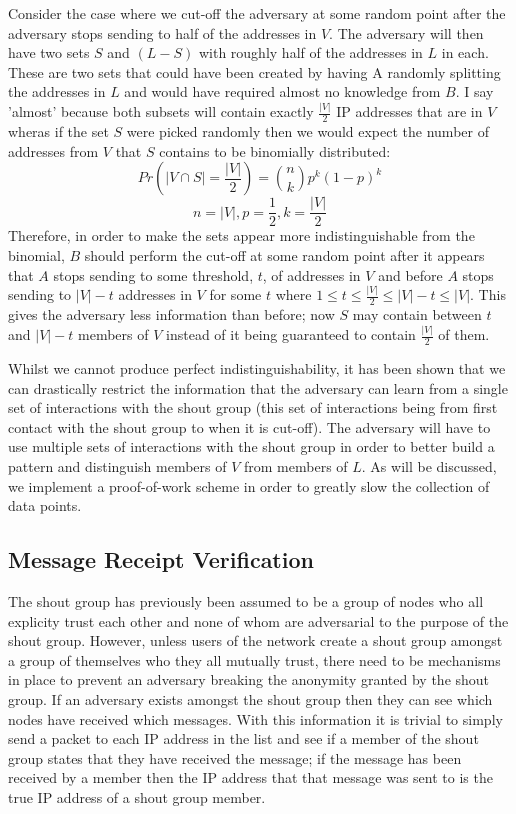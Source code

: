 \documentclass[ %
                    author={Luke Murray},
                supervisor={Dr. Simon Hollis},
                     title={Shadow Peer-to-Peer Networks},
                  subtitle={},
                    degree={MEng},
                      year={2013} ]{thesis}
\begin{document}
Consider the case where we cut-off the adversary at some random point after the adversary stops sending to half of the addresses in $V$. The adversary will then have two sets $S$ and $(L - S)$ with roughly half of the addresses in $L$ in each. These are two sets that could have been created by having A randomly splitting the addresses in $L$ and would have required almost no knowledge from $B$. I say 'almost' because both subsets will contain exactly $\frac{|V|}{2}$ IP addresses that are in $V$ wheras if the set $S$ were picked randomly then we would expect the number of addresses from $V$ that $S$ contains to be binomially distributed: \[Pr(|V \cap S| = \frac{|V|}{2}) = {n \choose k}p^{k}(1-p)^{k}\]\[n = |V|, p = \frac{1}{2}, k = \frac{|V|}{2}\] Therefore, in order to make the sets appear more indistinguishable from the binomial, $B$ should perform the cut-off at some random point after it appears that $A$ stops sending to some threshold, $t$, of addresses in $V$ and before $A$ stops sending to $|V| - t$ addresses in $V$ for some $t$ where $1 \leq t \leq \frac{|V|}{2} \leq |V| - t \leq |V|$. This gives the adversary less information than before; now $S$ may contain between $t$ and $|V| - t$ members of $V$ instead of it being guaranteed to contain $\frac{|V|}{2}$ of them.

Whilst we cannot produce perfect indistinguishability, it has been shown that we can drastically restrict the information that the adversary can learn from a single set of interactions with the shout group (this set of interactions being from first contact with the shout group to when it is cut-off). The adversary will have to use multiple sets of interactions with the shout group in order to better build a pattern and distinguish members of $V$ from members of $L$. As will be discussed, we implement a proof-of-work scheme in order to greatly slow the collection of data points.


\subsection{Message Receipt Verification}

The shout group has previously been assumed to be a group of nodes who all explicity trust each other and none of whom are adversarial to the purpose of the shout group. However, unless users of the network create a shout group amongst a group of themselves who they all mutually trust, there need to be mechanisms in place to prevent an adversary breaking the anonymity granted by the shout group. If an adversary exists amongst the shout group then they can see which nodes have received which messages. With this information it is trivial to simply send a packet to each IP address in the list and see if a member of the shout group states that they have received the message; if the message has been received by a member then the IP address that that message was sent to is the true IP address of a shout group member.
\end{document}
